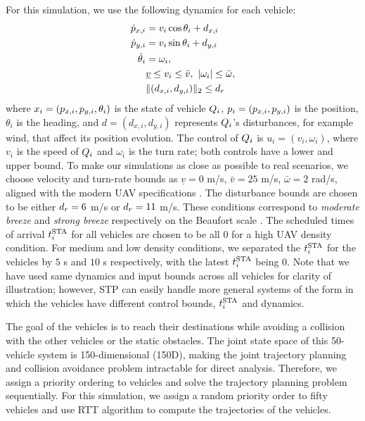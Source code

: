 For this simulation, we use the following dynamics for each vehicle:
\begin{equation}
\label{eq:dyn_i}
\begin{aligned}
\dot{p}_{x,i} &= v_i \cos \theta_i + d_{x,i} \\
\dot{p}_{y,i} &= v_i \sin \theta_i + d_{y,i}\\
\dot{\theta}_i &= \omega_i, \\
& \underline{v} \le v_i \le \bar{v}, ~|\omega_i| \le \bar{\omega}, \\
& \|(d_{x,i}, d_{y,i}) \|_2 \le d_{r}
\end{aligned}
\end{equation}
\noindent where $x_i = (p_{x,i}, p_{y,i}, \theta_i)$ is the state of vehicle $Q_i$, $p_i = (p_{x,i}, p_{y,i})$ is the position, $\theta_i$ is the heading, and $d = (d_{x,i}, d_{y,i})$ represents $Q_i$'s disturbances, for example wind, that affect its position evolution. The control of $Q_i$ is $u_i = (v_i, \omega_i)$, where $v_i$ is the speed of $Q_i$ and $\omega_i$ is the turn rate; both controls have a lower and upper bound. To make our simulations as close as possible to real scenarios, we choose velocity and turn-rate bounds as $\underline{v} = 0$ m/s, $\bar{v} = 25$ m/s, $\bar\omega = 2$ rad/s, aligned with the modern UAV specifications \cite{UAVspecs1, UAVspecs2}. The disturbance bounds are chosen to be either $d_r = 6$ m/s or $d_r= 11$ m/s. These conditions correspond to \textit{moderate breeze} and \textit{strong breeze} respectively on the Beaufort scale \cite{Windscale}. The scheduled times of arrival $t^\text{STA}_i$ for all vehicles are chosen to be all $0$ for a high UAV density condition. For medium and low density conditions, we separated the $t^\text{STA}_i$ for the vehicles by $5$ s and $10$ s respectively, with the latest $t^\text{STA}_i$ being 0. Note that we have used same dynamics and input bounds across all vehicles for clarity of illustration; however, STP can easily handle more general systems of the form in which the vehicles have different control bounds, $t^\text{STA}_i$ and dynamics.

The goal of the vehicles is to reach their destinations while avoiding a collision with the other vehicles or the static obstacles. The joint state space of this 50-vehicle system is 150-dimensional (150D), making the joint trajectory planning and collision avoidance problem intractable for direct analysis. Therefore, we assign a priority ordering to vehicles and solve the trajectory planning problem sequentially. For this simulation, we assign a random priority order to fifty vehicles and use RTT algorithm to compute the trajectories of the vehicles. 